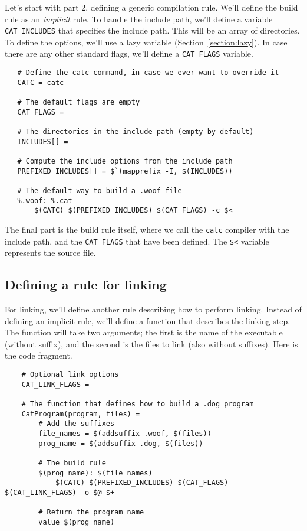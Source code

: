 Let's start with part 2, defining a generic compilation rule.  We'll define the build rule as an
\emph{implicit} rule.  To handle the include path, we'll define a variable \verb+CAT_INCLUDES+ that
specifies the include path.  This will be an array of directories.  To define the options, we'll use
a lazy variable (Section~\ref{section:lazy}).  In case there
are any other standard flags, we'll define a \verb+CAT_FLAGS+ variable.

\begin{verbatim}
   # Define the catc command, in case we ever want to override it
   CATC = catc

   # The default flags are empty
   CAT_FLAGS =
   
   # The directories in the include path (empty by default)
   INCLUDES[] =

   # Compute the include options from the include path
   PREFIXED_INCLUDES[] = $`(mapprefix -I, $(INCLUDES))

   # The default way to build a .woof file
   %.woof: %.cat
       $(CATC) $(PREFIXED_INCLUDES) $(CAT_FLAGS) -c $<
\end{verbatim}

The final part is the build rule itself, where we call the \verb+catc+ compiler with the include
path, and the \verb+CAT_FLAGS+ that have been defined.  The \verb+$<+ variable represents the source
file.

\subsection{Defining a rule for linking}

For linking, we'll define another rule describing how to perform linking.  Instead of defining an
implicit rule, we'll define a function that describes the linking step.  The function will take two
arguments; the first is the name of the executable (without suffix), and the second is the files to
link (also without suffixes).  Here is the code fragment.

\begin{verbatim}
    # Optional link options
    CAT_LINK_FLAGS =

    # The function that defines how to build a .dog program
    CatProgram(program, files) =
        # Add the suffixes
        file_names = $(addsuffix .woof, $(files))
        prog_name = $(addsuffix .dog, $(files))

        # The build rule
        $(prog_name): $(file_names)
            $(CATC) $(PREFIXED_INCLUDES) $(CAT_FLAGS) $(CAT_LINK_FLAGS) -o $@ $+

        # Return the program name
        value $(prog_name)
\end{verbatim}

